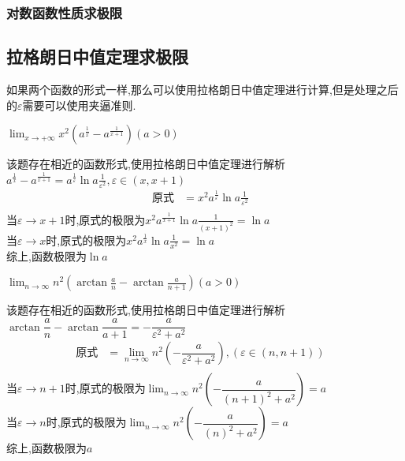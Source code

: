 \documentclass[10pt, a4paper, oneside, UTF8]{ctexbook}
\begin{document}
\begin{sloppypar}
    \subsubsection{对数函数性质求极限}
    \subsection{拉格朗日中值定理求极限}
    如果两个函数的形式一样,那么可以使用拉格朗日中值定理进行计算,但是处理之后的$\varepsilon$需要可以使用夹逼准则.
    \begin{problem}
    $\lim_{x\to+\infty}x^{2}\left(a^{\frac{1}{x}}-a^{\frac{1}{x+1}}\right)\left(a>0\right)$        
    \end{problem}
    \begin{solution}
        该题存在相近的函数形式,使用拉格朗日中值定理进行解析$a^{\frac{1}{x}}-a^{\frac{1}{x+1}}=a^{\frac{1}{\varepsilon}}\ln a\frac{1}{\varepsilon ^2},\varepsilon \in (x,x+1)$
        \begin{align*}
            \text{原式} & = x^2 a^{\frac{1}{\varepsilon}}\ln a\frac{1}{\varepsilon ^2} &\\
        \end{align*}
        当$\varepsilon \to x+1$时,原式的极限为$x^2 a^{\frac{1}{x+1}}\ln a \frac{1}{(x+1)^2}=\ln a$\\
        当$\varepsilon \to x$时,原式的极限为$x^2 a^{\frac{1}{x}}\ln a \frac{1}{x^2}=\ln a$\\
        综上,函数极限为$\ln a$
    \end{solution}
    \begin{problem}
        $\lim_{n\to\infty}n^{2}\left(\arctan\frac{a}{n}-\arctan\frac{a}{n+1}\right)\left(a>0\right)$
    \end{problem}
    \begin{solution}
        该题存在相近的函数形式,使用拉格朗日中值定理进行解析$\arctan \dfrac{a}{n}-\arctan \dfrac{a}{a+1}=-\dfrac{a}{ \varepsilon^2 +a^2}$
        \begin{align*}
            \text{原式} & =\lim_{n\to \infty} n^2(-\dfrac{a}{\varepsilon^2+a^2}),(\varepsilon \in (n,n+1) ) &\\
        \end{align*}
        当$\varepsilon \to n+1$时,原式的极限为$\lim_{n\to \infty} n^2(-\dfrac{a}{(n+1)^2+a^2})=a$\\
        当$\varepsilon \to n$时,原式的极限为$\lim_{n\to \infty}n^2(-\dfrac{a}{(n)^2+a^2})=a$\\
        综上,函数极限为$a$
    \end{solution}

\end{sloppypar}
\end{document}
